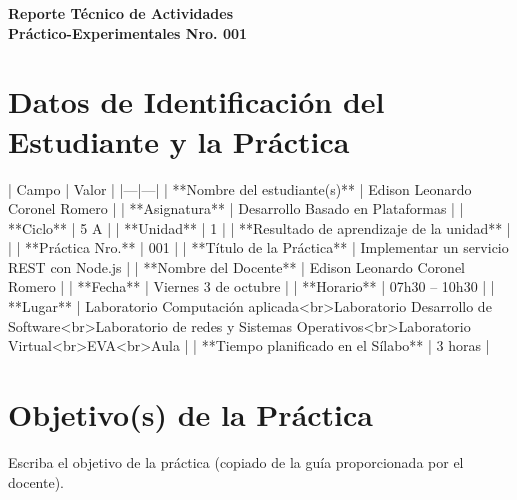 \documentclass[11pt,a4paper]{article}
\begin{document}
\thispagestyle{fancy}

\vspace*{0.15cm}

\begin{center}
{\bfseries\fontsize{23}{26}\selectfont
Reporte Técnico de Actividades\\
Práctico-Experimentales Nro. 001\par}
\end{center}

\section{Datos de Identificación del Estudiante y la Práctica}

| Campo                                      | Valor                                                                 |
|---|---|
| **Nombre del estudiante(s)**              | Edison Leonardo Coronel Romero                                       |
| **Asignatura**                            | Desarrollo Basado en Plataformas                                     |
| **Ciclo**                                 | 5 A                                                                  |
| **Unidad**                                | 1                                                                    |
| **Resultado de aprendizaje de la unidad** |                                                                      |
| **Práctica Nro.**                         | 001                                                                  |
| **Título de la Práctica**                 | Implementar un servicio REST con Node.js                             |
| **Nombre del Docente**                    | Edison Leonardo Coronel Romero                                       |
| **Fecha**                                 | Viernes 3 de octubre                                                 |
| **Horario**                               | 07h30 -- 10h30                                                       |
| **Lugar**                                 | Laboratorio Computación aplicada<br>Laboratorio Desarrollo de Software<br>Laboratorio de redes y Sistemas Operativos<br>Laboratorio Virtual<br>EVA<br>Aula |
| **Tiempo planificado en el Sílabo**       | 3 horas                                                              |

\section{Objetivo(s) de la Práctica}
Escriba el objetivo de la práctica (copiado de la guía proporcionada por el docente).
\end{document}
